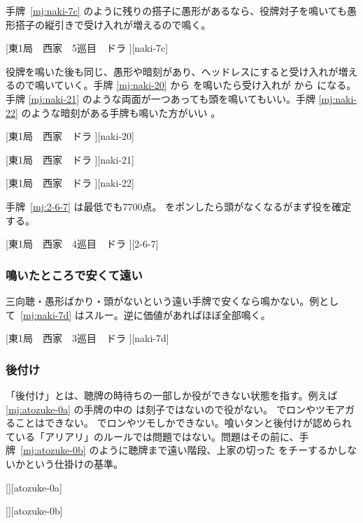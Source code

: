 \documentclass[../nankiru_main.tex]{subfiles}
\begin{document}
手牌~\ref{mj:naki-7c} のように残りの搭子に愚形があるなら、役牌対子を鳴いても愚形搭子の縦引きで受け入れが増えるので鳴く。

[東1局　西家　5巡目　ドラ ][naki-7c]

役牌を鳴いた後も同じ、愚形や暗刻があり、ヘッドレスにすると受け入れが増えるので鳴いていく。手牌 \ref{mj:naki-20} から  を鳴いたら受け入れが  から  になる。手牌 \ref{mj:naki-21} のような両面が一つあっても頭を鳴いてもいい。手牌 \ref{mj:naki-22} のような暗刻がある手牌も鳴いた方がいい \citep[][p.~199]{hirasawa-naki}。

[東1局　西家　ドラ ][naki-20]

[東1局　西家　ドラ ][naki-21]

[東1局　西家　ドラ ][naki-22]

手牌~\ref{mj:2-6-7} は最低でも7700点。 をポンしたら頭がなくなるがまず役を確定する\citep[][pp.~164--167]{tetsusenryaku}。

[東1局　西家　4巡目　ドラ ][2-6-7]


\subsubsection*{鳴いたところで安くて遠い} 

三向聴・愚形ばかり・頭がないという遠い手牌で安くなら鳴かない\citep[][p.~110]{hirasawa-naki}。例として~\ref{mj:naki-7d} はスルー。逆に価値があればほぼ全部鳴く。

[東1局　西家　3巡目　ドラ ][naki-7d]


\subsubsection*{後付け}

「後付け」とは、聴牌の時待ちの一部しか役ができない状態を指す。例えば \ref{mj:atozuke-0a} の手牌の中の  は刻子ではないので役がない。 でロンやツモアガることはできない。 でロンやツモしかできない。喰いタンと後付けが認められている「アリアリ」のルールでは問題ではない。問題はその前に、手牌~\ref{mj:atozuke-0b} のように聴牌まで遠い階段、上家の切った  をチーするかしないかという仕掛けの基準。

[][atozuke-0a]

[][atozuke-0b]
\end{document}
